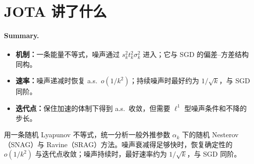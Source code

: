 \documentclass[11pt]{ctexart}
\begin{document}
\section{JOTA 讲了什么}

\paragraph{Summary.}
\begin{itemize}
  \item \textbf{机制：}一条能量不等式，噪声通过 $s_k^2t_k^2\sigma_k^2$ 进入；它与 SGD 的偏差--方差结构同构。
  \item \textbf{速率：}噪声递减时恢复 a.s.\ $o(1/k^2)$；持续噪声时最好约为 $1/\sqrt{k}$，与 SGD 同阶。
  \item \textbf{迭代点：}保住加速的体制下得到 a.s.\ 收敛，但需要 $\ell^1$ 型噪声条件和不降的步长。
\end{itemize}

\citet{attouch2026ravine} 用一条随机 Lyapunov 不等式，统一分析一般外推参数 $\alpha_k$ 下的随机 Nesterov（SNAG）与 Ravine（SRAG）方法。噪声衰减得足够快时，恢复确定性的 $o(1/k^2)$ 与迭代点收敛；噪声持续时，最好速率约为 $1/\sqrt{k}$，与 SGD 同阶。
\end{document}
